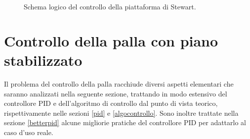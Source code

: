 \documentclass[12pt,twoside,openright]{report}
\begin{document}
\begin{figure}[h!]
{
}
\caption{Schema logico del controllo della piattaforma di Stewart.} \label{fig:ps}
\end{figure}
\newpage
\chapter{Controllo della palla con piano stabilizzato}\label{controllopalla}
Il problema del controllo della palla racchiude diversi aspetti elementari che saranno analizzati nella seguente sezione, trattando in modo estensivo del controllore PID e dell'algoritmo di controllo dal punto di vista teorico, rispettivamente nelle sezioni \ref{pid} e \ref{algocontrollo}. Sono inoltre trattate nella sezione \ref{betterpid} alcune migliorie pratiche del controllore PID per adattarlo al caso d'uso reale.
\end{document}
